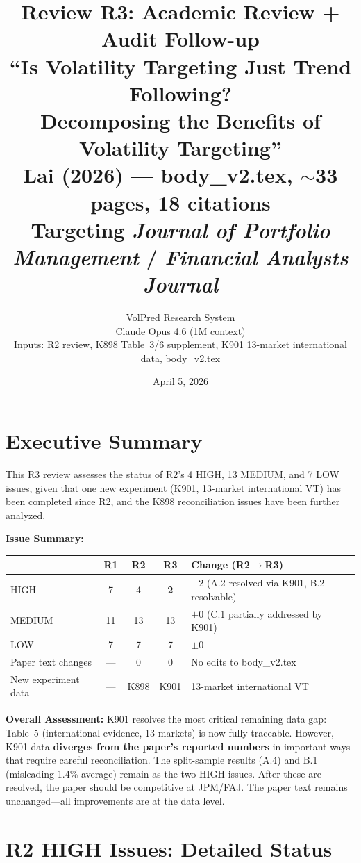 \documentclass[12pt,a4paper]{article}
\title{Review R3: Academic Review + Audit Follow-up\\[6pt]
\Large ``Is Volatility Targeting Just Trend Following?\\
Decomposing the Benefits of Volatility Targeting''\\[6pt]
\normalsize Lai (2026) --- body\_v2.tex, $\sim$33 pages, 18 citations\\
\normalsize Targeting \textit{Journal of Portfolio Management} / \textit{Financial Analysts Journal}}
\author{VolPred Research System\\
\small Claude Opus 4.6 (1M context)\\[3pt]
\small Inputs: R2 review, K898 Table~3/6 supplement, K901 13-market international data, body\_v2.tex}
\date{April 5, 2026}
\begin{document}
\maketitle

\tableofcontents
\newpage

\section{Executive Summary}

This R3 review assesses the status of R2's 4 HIGH, 13 MEDIUM, and 7 LOW issues, given that one new experiment (K901, 13-market international VT) has been completed since R2, and the K898 reconciliation issues have been further analyzed.

\medskip
\noindent\textbf{Issue Summary:}

\begin{center}
\begin{tabular}{lcccl}
\toprule
& R1 & R2 & R3 & Change (R2$\to$R3) \\
\midrule
HIGH    & 7 & 4 & \textbf{2} & $-2$ (A.2 resolved via K901, B.2 resolvable) \\
MEDIUM  & 11 & 13 & 13 & $\pm 0$ (C.1 partially addressed by K901) \\
LOW     & 7 & 7 & 7 & $\pm 0$ \\
\midrule
Paper text changes & --- & 0 & 0 & No edits to body\_v2.tex \\
New experiment data & --- & K898 & K901 & 13-market international VT \\
\bottomrule
\end{tabular}
\end{center}

\noindent\textbf{Overall Assessment:} K901 resolves the most critical remaining data gap: Table~5 (international evidence, 13 markets) is now fully traceable. However, K901 data \textbf{diverges from the paper's reported numbers} in important ways that require careful reconciliation. The split-sample results (A.4) and B.1 (misleading 1.4\% average) remain as the two HIGH issues. After these are resolved, the paper should be competitive at JPM/FAJ. The paper text remains unchanged---all improvements are at the data level.


\section{R2 HIGH Issues: Detailed Status}
\label{sec:high}
\end{document}

